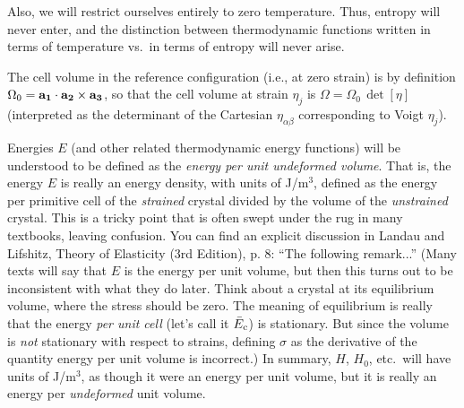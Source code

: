 \documentclass[11pt,fleqn]{article}
\def\O{\Omega}
\def\Oo{\Omega_0}
\begin{document}
Also, we will restrict ourselves entirely to zero temperature.
Thus, entropy will never enter, and the distinction between
thermodynamic functions written in terms of temperature vs.\ in
terms of entropy will never arise.

The cell volume in the reference configuration (i.e., at zero strain)
is by definition $\Oo={\bf a_1}\cdot{\bf a_2}\times{\bf a_3}$, so that
the cell volume at strain $\eta_j$ is $\O=\Oo\,\det[\eta]$
(interpreted as the determinant of the Cartesian
$\eta_{\alpha\beta}$ corresponding to Voigt $\eta_j$).

Energies $E$ (and other related thermodynamic energy functions)
will be understood to be defined as the {\it energy per unit
undeformed volume}.  That is, the energy $E$ is really an energy
density, with units of J/m$^3$, defined as the energy per primitive
cell of the {\it strained} crystal divided by the volume of the
{\it unstrained} crystal.  This is a tricky point that is often swept
under the rug in many textbooks, leaving confusion.  You can find
an explicit discussion in Landau and Lifshitz, Theory of Elasticity
(3rd Edition), p. 8: ``The following remark...''  (Many texts
will say that $E$ is the energy per unit volume, but then this
turns out to be inconsistent with what they do later.  Think
about a crystal at its equilibrium volume, where the stress should
be zero.  The meaning of equilibrium is really that the energy
{\it per unit cell} (let's call it $\bar{E}_{\rm c}$) is stationary.
But since the volume is {\it not} stationary with respect to
strains, defining $\sigma$ as the derivative of the quantity
energy per unit volume is incorrect.)  In summary, $H$, $H_0$,
etc.\ will have units of J/m$^3$, as
though it were an energy per unit volume, but it is really an
energy per {\it undeformed} unit volume.
\end{document}
